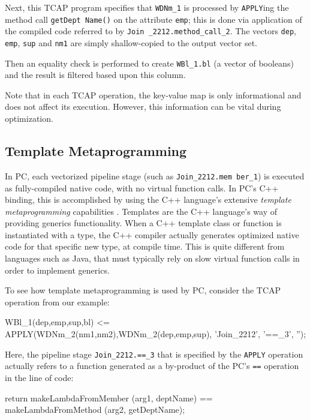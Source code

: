 Next, this TCAP program
specifies that \texttt{WDNm\_1} is processed by \texttt{APPLY}ing the
method call \texttt{getDept Name()} on the attribute \texttt{emp}; this is 
done via application of the compiled code referred to by \texttt{Join
  \_2212.method\_call\_2}.  
The vectors \texttt{dep}, \texttt{emp}, \texttt{sup}
and \texttt{nm1} are simply shallow-copied to the output vector set.

Then an equality check is performed to create \texttt{WBl\_1.bl}
(a vector of booleans) and the result is filtered based upon this
column.


Note that in each TCAP operation, the key-value map is only
informational and does not affect its execution.  However, this
information can be vital during optimization.  

\subsection{Template Metaprogramming}

In PC,
each vectorized pipeline stage (such as \texttt{Join\_2212.mem ber\_1}) is executed as fully-compiled native code, with no virtual function
calls.
In PC's C++ binding, this is accomplished by using the C++ language's extensive \emph{template metaprogramming} 
capabilities \cite{josuttis2012c++}.  Templates are the C++ language's way of providing generics functionality.
When a C++ template class or
function is instantiated with a type, %
the C++ compiler actually generates optimized native code for that specific new type, at compile time.  
This is quite different from languages
such as Java, that must typically rely on slow virtual
function calls in order to implement generics.

To see how template metaprogramming is used by PC, consider
the TCAP operation from our example:

\begin{codesmall}
WBl_1(dep,emp,sup,bl) <= 
   APPLY(WDNm_2(nm1,nm2),WDNm_2(dep,emp,sup), 
      'Join_2212', '==_3', '');
\end{codesmall}

\noindent
Here, the pipeline stage \texttt{Join\_2212.==\_3} that is specified by the \texttt{APPLY} operation
actually refers to a function generated as a by-product of the
PC's \texttt{==} operation
in the line of code:

\begin{codesmall} 
return makeLambdaFromMember (arg1, deptName) == 
    makeLambdaFromMethod (arg2, getDeptName); 
\end{codesmall}

